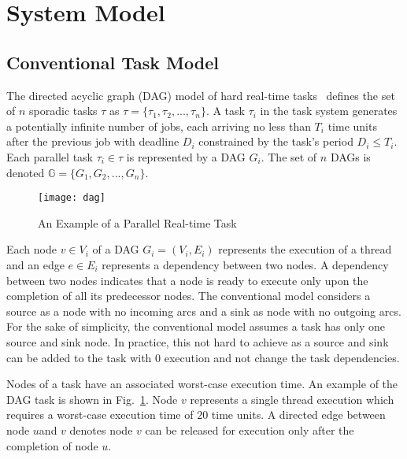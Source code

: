 \section{System Model}

\subsection{Conventional Task Model}
The directed acyclic graph (DAG) model of hard real-time
tasks~\cite{li2014analysis} defines the set of ${n}$ sporadic tasks ${\tau}$ as
${\tau = \{\tau_1,\tau_2, ..., \tau_n\}}$. A task ${\tau_i}$
in the task system generates a potentially infinite number of jobs,
each arriving no less than ${T_i}$ time units after the previous
job with deadline ${D_i}$ constrained by the task's period
${D_i \leq T_i}$. Each parallel task ${\tau_i \in \tau}$
is represented by a DAG ${G_i}$. The set of ${n}$ DAGs is
denoted ${\mathbb{G} = \{G_1, G_2, ..., G_n\}}$.

\begin{figure}[!h]
  \centering
  \texttt{[image: dag]}
  \caption{An Example of a Parallel Real-time Task}
  \label{fig:dag}
\end{figure}
  


Each node ${v \in V_i}$ of a DAG ${G_i =
  (V_i, E_i)}$ represents the 
execution of a thread and an edge ${e \in E_i}$ represents a
dependency between two nodes. A dependency between two nodes indicates
that a node is ready to execute only upon the completion of all its
predecessor nodes. The conventional model considers a source as a node with no incoming
arcs and a sink as node with no outgoing arcs. For the sake of
simplicity, the conventional model assumes a task has only one source and sink node. In
practice, this not hard to achieve as a source and sink can be added
to the task with $0$ execution and not change the task dependencies.

Nodes of a task have an associated worst-case execution time. 
An example of the DAG task is shown in Fig.~\ref{fig:dag}. Node $v$ represents a single thread execution which requires a worst-case execution time of $20$ time units. A directed edge between node $u$and $v$ denotes node $v$ can be released for execution only after the completion of node $u$.

